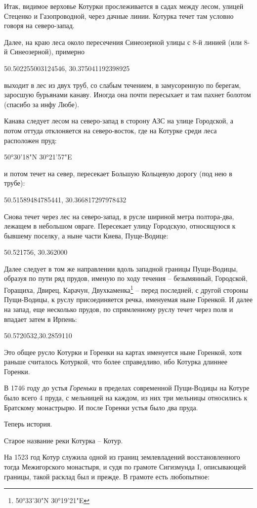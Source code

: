 Итак, видимое верховье Котурки прослеживается в садах между лесом, улицей Стеценко и Газопроводной, через дачные линии. Котурка течет там условно говоря на северо-запад. 

Далее, на краю леса около пересечения Синеозерной улицы с 8-й линией (или 8-й Синеозерной), примерно 

50.502255003124546, 30.375041192398925

выходит в лес из двух труб, со слабым течением,
в замусоренную по берегам, заросшую бурьянами канаву. Иногда она почти пересыхает и там пахнет болотом (спасибо за инфу Любе).

Канава следует лесом на северо-запад в сторону АЗС на улице Городской, а потом оттуда отклоняется на северо-восток, где на Котурке среди леса расположен пруд:

50°30'18"N 30°21'57"E

и потом течет на север, пересекает Большую Кольцевую дорогу (под нею в трубе):

50.51589484785441, 30.366817297978432 

Снова течет через лес на северо-запад, в русле шириной метра полтора-два, лежащем в небольшом овраге. Пересекает улицу Городскую, относящуюся к бывшему поселку, а ныне части Киева, Пуще-Водице:

50.521756, 30.362000

Далее следует в том же направлении вдоль западной границы Пущи-Водицы, образуя по пути ряд прудов, именую по ходу течения – безымянный, Городской, Горащиха, Двирец, Карачун, Двухкаменка\footnote{50°33'30"N   30°19'21"E} – перед последней, с другой стороны Пущи-Водицы, к руслу присоединяется речка, именуемая ныне Г\'оренкой. И далее на запад, еще несколько прудов, по спрямленному руслу течет через поля и впадает затем в Ирпень:

50.5720532,30.2859110

Это общее русло Котурки и Горенки на картах именуется ныне Горенкой, хотя раньше считалось Котуркой, что более справедливо, ибо Котурка длиннее Горенки.

В 1746 году до устья \textit{Гореньки} в пределах современной Пущи-Водицы на Котуре было всего 4 пруда, с мельницей на каждом, из них три мельницы относились к Братскому монастрырю. И после Горенки устья было два пруда.

Теперь история.

Старое название реки Котурка – Котур.

На 1523 год Котур служила одной из границ землевладений восстановленного тогда Межигорского монастыря, и судя по грамоте Сигизмунда I, описывающей границы, такой расклад был и прежде. В грамоте есть любопытное:

